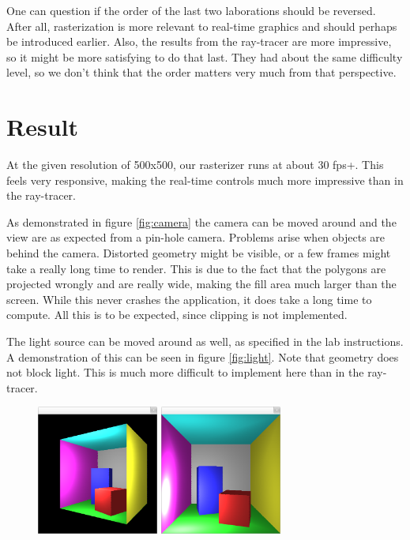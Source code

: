 \documentclass[a4paper]{article}
\begin{document}
One can question if the order of the last two laborations should be reversed. After
all, rasterization is more relevant to real-time graphics and should perhaps
be introduced earlier. Also, the results from the ray-tracer are more impressive,
so it might be more satisfying to do that last. They had about the same difficulty
level, so we don't think that the order matters very much from that perspective.


\section{Result}

At the given resolution of 500x500, our rasterizer runs at about 30 fps+. This
feels very responsive, making the real-time controls much more impressive than
in the ray-tracer.

As demonstrated in figure \ref{fig:camera} the camera can be moved around and
the view are as expected from a pin-hole camera.
Problems arise when objects are behind the camera. Distorted geometry might be
visible, or a few frames might take a really long time to render. This is due
to the fact that the polygons are projected wrongly and are really wide, making
the fill area much larger than the screen. While this never crashes the
application, it does take a long time to compute. All this is to be expected,
since clipping is not implemented.

The light source can be moved around as well, as specified in the lab instructions. A
demonstration of this can be seen in figure \ref{fig:light}. Note that geometry does
not block light. This is much more difficult to implement here than in the ray-tracer.

\begin{figure}[H]
    \centering
    \begin{minipage}{.5\textwidth}
        \centering
        \includegraphics[width=4cm]{ani0.png}
    \end{minipage}%
    \begin{minipage}{.5\textwidth}
        \centering
        \includegraphics[width=4cm]{light0.png}
    \end{minipage}
\end{figure}
\end{document}
